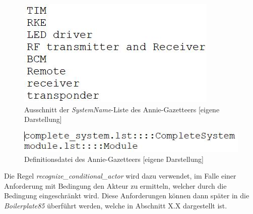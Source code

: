 \documentclass[12pt]{report}
\begin{document}
\begin{figure}[H]
\begin{center}
\includegraphics[scale=1]{Bilder/SystemNameGazetteer.jpg}
\caption{Ausschnitt der \textit{SystemName}-Liste des Annie-Gazetteers [eigene Darstellung]}
\end{center}
\end{figure}

\begin{figure}[H]
\begin{center}
\includegraphics[scale=1]{Bilder/DefGazetteer.jpg}
\caption{Definitionsdatei des Annie-Gazetteers [eigene Darstellung]}
\end{center}
\end{figure}

Die Regel \textit{recognize\_conditional\_actor} wird dazu verwendet, im Falle einer Anforderung mit Bedingung den Akteur zu ermitteln, welcher durch die Bedingung eingeschränkt wird. Diese Anforderungen können dann später in die \textit{Boilerplate85} überführt werden, welche in Abschnitt X.X dargestellt ist. 
\end{document}
